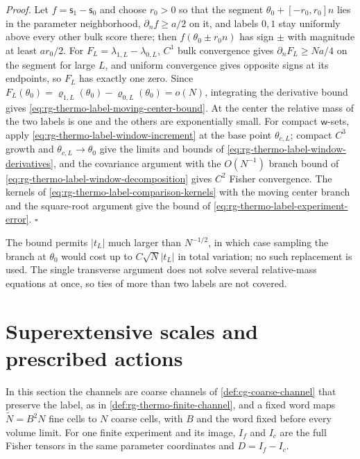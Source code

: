 \noindent\emph{Proof.}
Let $f=\mathsf s_1-\mathsf s_0$ and choose $r_0>0$ so that the segment
$\theta_0+[-r_0,r_0]n$ lies in the parameter neighborhood,
$\partial_nf\geq a/2$ on it, and labels $0,1$ stay uniformly above every
other bulk score there; then $f(\theta_0\pm r_0n)$ has sign $\pm$ with
magnitude at least $ar_0/2$. For $F_L=\lambda_{1,L}-\lambda_{0,L}$, $C^1$
bulk convergence gives $\partial_nF_L\geq Na/4$ on the segment for large
$L$, and uniform convergence gives opposite signs at its endpoints, so $F_L$
has exactly one zero. Since $F_L(\theta_0)=\varrho_{1,L}(\theta_0)-\varrho_{0,L}(\theta_0)=o(N)$,
integrating the derivative bound gives
\cref{eq:rg-thermo-label-moving-center-bound}. At the center the relative
mass of the two labels is one and the others are exponentially small. For
compact $\mathsf w$-sets, apply
\cref{eq:rg-thermo-label-window-increment} at the base point $\theta_{c,L}$;
compact $C^3$ growth and $\theta_{c,L}\to\theta_0$ give the limits and bounds of
\cref{eq:rg-thermo-label-window-derivatives}, and the covariance argument with
the $O(N^{-1})$ branch bound of \cref{eq:rg-thermo-label-window-decomposition}
gives $C^2$ Fisher convergence. The kernels of
\cref{eq:rg-thermo-label-comparison-kernels} with the moving center branch
and the square-root argument give the bound of
\cref{eq:rg-thermo-label-experiment-error}. $\square$

The bound permits $|t_L|$ much larger than $N^{-1/2}$, in which case sampling
the branch at $\theta_0$ would cost up to $C\sqrt N|t_L|$ in total variation;
no such replacement is used. The single transverse argument does not solve
several relative-mass equations at once, so ties of more than two labels are
not covered.

\section{Superextensive scales and prescribed actions}
\label{sec:rg-thermo-accounting-proof}

In this section the channels are coarse channels of
\cref{def:cg-coarse-channel} that preserve the label, as in
\cref{def:rg-thermo-finite-channel}, and a fixed word maps $\widetilde N=B^2N$
fine cells to $N$ coarse cells, with $B$ and the word fixed before every
volume limit. For one finite experiment and its image, $I_f$ and $I_c$ are the
full Fisher tensors in the same parameter coordinates and $D=I_f-I_c$.

